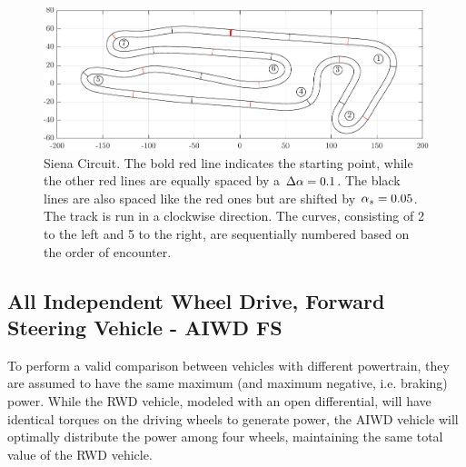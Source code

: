 \begin{figure}[]
	\centering
	\includegraphics[scale = .85]{Images/DrivingStyles/siena_track.pdf}
	\caption{Siena Circuit. The bold red line indicates the starting point, while the other red lines are equally spaced by a $\Delta\alpha=0.1$. The black lines are also spaced like the red ones but are shifted by $\alpha_s=0.05$. The track is run in a clockwise direction. The curves, consisting of 2 to the left and 5 to the right, are sequentially numbered based on the order of encounter.}
	\label{fig:siena_track}
\end{figure}

\subsection{All Independent Wheel Drive, Forward Steering Vehicle - AIWD FS}
\label{sec:awdfs}
To perform a valid comparison between vehicles with different powertrain, they are assumed to have the same maximum (and maximum negative, i.e. braking) power. While the RWD vehicle, modeled with an open differential, will have identical torques on the driving wheels to generate power, the AIWD vehicle will  optimally distribute the power among four wheels, maintaining the same total value of the RWD vehicle.

